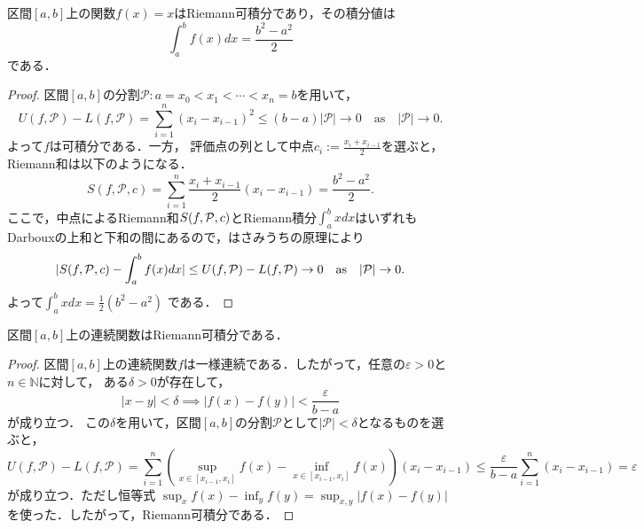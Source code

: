 \begin{example}
    区間$[a,b]$上の関数$f(x) = x$はRiemann可積分であり，その積分値は
    \[ \int_a^b f(x) dx = \frac{b^2 - a^2}{2} \]
    である．
\end{example}
\begin{proof}
    
    区間$[a,b]$の分割$\mathcal{P} : a = x_0 < x_1 < \cdots < x_n = b$を用いて，
 \[
  U(f,\mathcal P) - L(f,\mathcal P) = \sum_{i=1}^n (x_i-x_{i-1}
 )^2 \le (b-a)|\mathcal P| \to 0 \quad \text{as} \quad |\mathcal P| \to 0.
 \]
 よって$f$は可積分である．一方，
    評価点の列として中点$c_i := \frac{x_i+x_{i-1}}{2}$を選ぶと，Riemann和は以下のようになる．
    \[
    S(f,\mathcal{P},c) = \sum_{i=1}^n \frac{x_i + x_{i-1}}{2} (x_i - x_{i-1}) = \frac{b^2 - a^2}{2}.
    \]
ここで，中点によるRiemann和$S(f,\mathcal P,c)$とRiemann積分$\int_a^b x dx$はいずれもDarbouxの上和と下和の間にあるので，はさみうちの原理により
\[
|S(f,\mathcal{P},c) - \int_a^b f(x) dx| \le U(f,\mathcal P) - L(f,\mathcal P) \to 0 \quad \text{as} \quad |\mathcal P| \to 0.
\]
    よって$\int_a^b x dx = \frac{1}{2}(b^2-a^2)$ である．
\end{proof}

\begin{example}
    区間$[a,b]$上の連続関数はRiemann可積分である．
\end{example}
\begin{proof}
    区間$[a,b]$上の連続関数$f$は一様連続である．したがって，任意の$\varepsilon > 0$と$n \in \mathbb{N}$に対して，
    ある$\delta >0$が存在して，\[|x-y| < \delta \implies |f(x) - f(y)| < \frac{\varepsilon}{b-a}\]が成り立つ．
    この$\delta$を用いて，区間$[a,b]$の分割$\mathcal{P}$として$|\mathcal P| < \delta$となるものを選ぶと，
    \[U(f,\mathcal{P}) - L(f,\mathcal{P}) = \sum_{i=1}^n \left( \sup_{x \in [x_{i-1}, x_i]} f(x) - \inf_{x \in [x_{i-1}, x_i]} f(x) \right)(x_i - x_{i-1}) \le \frac{\varepsilon}{b-a} \sum_{i=1}^n (x_i - x_{i-1}) = \varepsilon\]
    が成り立つ．ただし恒等式 $\sup_x f(x) - \inf_y f(y) = \sup_{x,y} |f(x) - f(y)|$ を使った．したがって，Riemann可積分である．
\end{proof}




